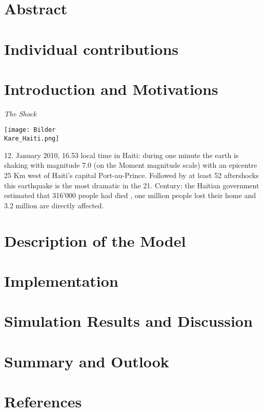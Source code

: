 \documentclass[11pt]{article}
\begin{document}
\section{Abstract}

\section{Individual contributions}

\section{Introduction and Motivations}
\textit{The Shock}
\begin{floatingfigure}{3 cm}
\texttt{[image: Bilder\\Kare\_Haiti.png]}
\end{floatingfigure}

12. January 2010, 16.53 local time in Haiti: during one minute the earth is shaking with magnitude 7.0  (on the Moment magnitude scale) with an epicentre 25 Km west of Haiti’s capital Port-au-Prince. Followed by at least 52 aftershocks  this earthquake is the most dramatic in the 21. Century: the Haitian government estimated that 316’000 people had died , one million people lost their home  and 3.2 million are directly affected.

\section{Description of the Model}

\section{Implementation}

\section{Simulation Results and Discussion}

\section{Summary and Outlook}

\section{References}
\end{document}
